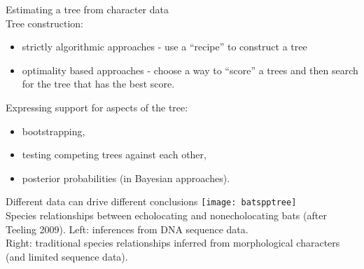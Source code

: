 \documentclass{beamer}
\begin{document}
\begin{frame}
Estimating a tree from character data\\
Tree construction:
\begin{itemize}
 \item strictly algorithmic approaches - use a “recipe” to construct a tree
  \item optimality based approaches - choose a way to “score” a trees and then search for the tree that has the best score.
\end{itemize}

Expressing support for aspects of the tree:
\begin{itemize}
 \item  bootstrapping,
 \item testing competing trees against each other,
 \item posterior probabilities (in Bayesian approaches).
\end{itemize}
\end{frame}

\begin{frame}
Different data can drive different conclusions
 \texttt{[image: batspptree]}\\
Species relationships between echolocating and nonecholocating bats (after Teeling 2009).
Left: inferences from DNA sequence data.\\
Right: traditional species relationships inferred from morphological characters (and limited sequence data).
\citep{hahn_irrational_2016}
\end{frame}


\appendix
\begin{frame}[allowframebreaks]
 
\end{frame}
\end{document}
